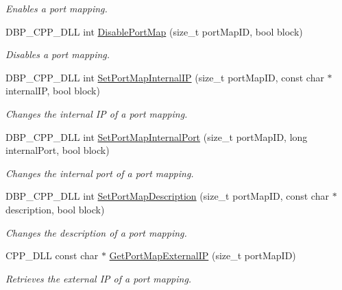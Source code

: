 \begin{DoxyCompactItemize}
\begin{DoxyCompactList}\small\item\em Enables a port mapping. \item\end{DoxyCompactList}\item 
DBP\_\-CPP\_\-DLL int \hyperlink{namespacemn_n_a_t_aab32fbe4d8c86dda1f0f5eae6edff81c}{DisablePortMap} (size\_\-t portMapID, bool block)
\begin{DoxyCompactList}\small\item\em Disables a port mapping. \item\end{DoxyCompactList}\item 
DBP\_\-CPP\_\-DLL int \hyperlink{namespacemn_n_a_t_a530f2074e8ca81e4570fcb8420f5b988}{SetPortMapInternalIP} (size\_\-t portMapID, const char $\ast$internalIP, bool block)
\begin{DoxyCompactList}\small\item\em Changes the internal IP of a port mapping. \item\end{DoxyCompactList}\item 
DBP\_\-CPP\_\-DLL int \hyperlink{namespacemn_n_a_t_a297eaf053cfa273d77b7d3f920284fd9}{SetPortMapInternalPort} (size\_\-t portMapID, long internalPort, bool block)
\begin{DoxyCompactList}\small\item\em Changes the internal port of a port mapping. \item\end{DoxyCompactList}\item 
DBP\_\-CPP\_\-DLL int \hyperlink{namespacemn_n_a_t_ae4990bc98b0165fa47ce4cbf9c002d9b}{SetPortMapDescription} (size\_\-t portMapID, const char $\ast$description, bool block)
\begin{DoxyCompactList}\small\item\em Changes the description of a port mapping. \item\end{DoxyCompactList}\item 
CPP\_\-DLL const char $\ast$ \hyperlink{namespacemn_n_a_t_aa4efb49b4881fce664be6fa9e362badf}{GetPortMapExternalIP} (size\_\-t portMapID)
\begin{DoxyCompactList}\small\item\em Retrieves the external IP of a port mapping. \item\end{DoxyCompactList}\item 

\end{DoxyCompactItemize}
